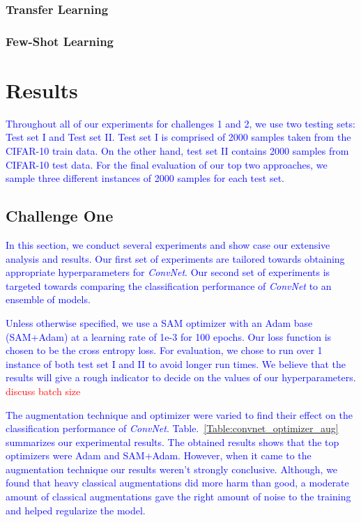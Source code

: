 \documentclass[a4paper,11pt]{article}
\begin{document}
\subsubsection{Transfer Learning}
\subsubsection{Few-Shot Learning}
\clearpage
\section{Results}
\textcolor{blue}{Throughout all of our experiments for challenges 1 and 2, we use two testing sets: Test set I and Test set II. Test set I is comprised of 2000 samples taken from the CIFAR-10 train data. On the other hand, test set II contains 2000 samples from CIFAR-10 test data. For the final evaluation of our top two approaches, we sample three different instances of 2000 samples for each test set.}
\subsection{Challenge One}
\textcolor{blue}{In this section, we conduct several experiments and show case our extensive analysis and results. Our first set of experiments are tailored towards obtaining appropriate hyperparameters for \textit{ConvNet}. Our second set of experiments is targeted towards comparing the classification performance of \textit{ConvNet} to an ensemble of models.}

\textcolor{blue}{Unless otherwise specified, we use a SAM optimizer with an Adam base (SAM+Adam) at a learning rate of 1e-3 for 100 epochs. Our loss function is chosen to be the cross entropy loss. For evaluation, we chose to run over 1 instance of both test set I and II to avoid longer run times. We believe that the results will give a rough indicator to decide on the values of our hyperparameters. }\textcolor{red}{discuss batch size}

\textcolor{blue}{The augmentation technique and optimizer were varied to find their effect on the classification performance of \textit{ConvNet}. Table.~\ref{Table:convnet_optimizer_aug} summarizes our experimental results. The obtained results shows that the top optimizers were Adam and SAM+Adam. However, when it came to the augmentation technique our results weren't strongly conclusive. Although, we found that heavy classical augmentations did more harm than good, a moderate amount of classical augmentations gave the right amount of noise to the training and helped regularize the model.}
\end{document}
